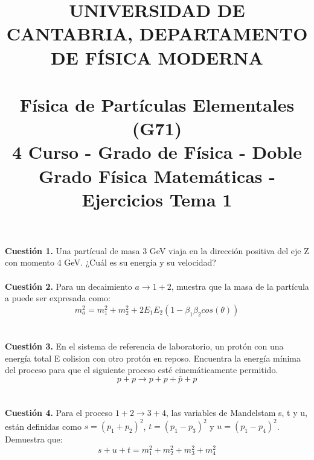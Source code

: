 \documentclass[paper=a4, fontsize=11pt]{scrartcl} %
\date{}
\title{	
\normalfont \normalsize 
\textsc{UNIVERSIDAD DE CANTABRIA, DEPARTAMENTO DE FÍSICA MODERNA} \\ [20pt] %
\horrule{0.5pt} \\[0.4cm] %
\huge Física de Partículas Elementales (G71) \\ %
\normalsize 4 Curso - Grado de Física - Doble Grado Física Matemáticas - Ejercicios Tema 1
\horrule{2pt} \\[0.5cm] %
}
\numberwithin{equation}{section} %
\numberwithin{figure}{section} %
\numberwithin{table}{section} %
\begin{document}
\maketitle %

\vspace{-2.5cm}

\textbf{Cuestión 1.} Una partícual de masa 3 GeV viaja en la dirección positiva del eje Z con momento 4 GeV. ¿Cuál es su energía y su velocidad?
\\
\\
\textbf{Cuestión 2.} Para un decaimiento $a\rightarrow 1 + 2$, muestra que la masa de la partícula a puede ser expresada como:
\begin{equation*}
m_{a}^2 = m_1^2 + m_2^2 + 2E_1E_2(1-\beta_1\beta_2cos(\theta))
\end{equation*}
\\
\\
\textbf{Cuestión 3.} En el sistema de referencia de laboratorio, un protón con una energía total E colision con otro protón en reposo. Encuentra la energía mínima del proceso para
que el siguiente proceso esté cinemáticamente permitido.
\begin{equation*}
p + p \rightarrow p + p + \bar{p} + p
\end{equation*}
\\
\\
\textbf{Cuestión 4.} Para el proceso $1 + 2 \rightarrow 3 + 4$, las variables de Mandelstam s, t y u, están definidas como $s = (p_1+p_2)^2$, $t = (p_1-p_3)^2$ y $u = (p_1-p_4)^2$. Demuestra que:
\begin{equation*}
s + u + t = m_1^2 + m_2^2 + m_3^2 + m_4^2
\end{equation*}
\\
\end{document}
